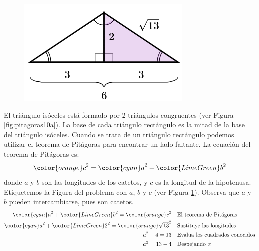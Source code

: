 \begin{solutionbox}{15cm}
\begin{minipage}{0.2\textwidth}
\begin{figure}[H]
            \label{fig:pitagoras10b}
        \end{figure}
        \begin{figure}[H]
            \centering
            \includegraphics[width=0.9\linewidth]{../images/pitagoras10c.png}
            \caption{}
            \label{fig:pitagoras10c}
        \end{figure}
    \end{minipage}\hfill
    \begin{minipage}{0.75\textwidth}
        El triángulo isóceles está formado por 2 triángulos congruentes (ver Figura \ref{fig:pitagoras10a}).
        La base de cada triángulo rectángulo es la mitad de la base del triángulo isóceles.
        Cuando se trata de un triángulo rectángulo podemos utilizar el teorema de Pitágoras para encontrar un lado faltante.
        La ecuación del teorema de Pitágoras es:
        \[{\color{orange}c}^2={\color{cyan}a}^2+{\color{LimeGreen}b}^2\]
        donde $a$ y $b$ son las longitudes de los catetos, y $c$ es la longitud de la hipotenusa.
        Etiquetemos la Figura del problema con $a$, $b$ y $c$ (ver Figura \ref{fig:pitagoras10b}).
        Observa que $a$ y $b$ pueden intercambiarse, pues son catetos.
        \begin{align*}
            {\color{cyan}a}^2+{\color{LimeGreen}b}^2  ={\color{orange}c}^2         & \text{\quad El teorema de Pitágoras}                          \\
            {\color{cyan}a}^2+{\color{LimeGreen}2}^2  ={\color{orange}\sqrt{13}}^2 & \text{\quad Sustituye las longitudes}                         \\
            a^2+4   =13                                                            & \text{\quad Evalua los cuadrados conocidos}                   \\
            a^2=13-4                                                               & \text{\quad Despejando } x                                    \\

\end{align*}
\end{minipage}
\end{solutionbox}
